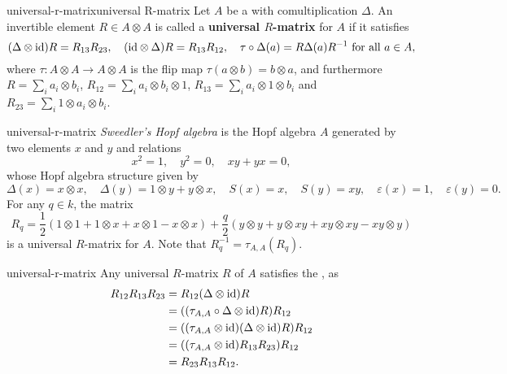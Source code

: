 \begin{topic}{universal-r-matrix}{universal R-matrix}
    Let $A$ be a  with comultiplication $\Delta$. An invertible element $R \in A \otimes A$ is called a \textbf{universal $R$-matrix} for $A$ if it satisfies
    \[ (\Delta \otimes \textup{id}) R = R_{13} R_{23}, \quad (\textup{id} \otimes \Delta) R = R_{13} R_{12}, \quad \tau \circ \Delta (a) = R \Delta(a) R^{-1} \textup{ for all } a \in A , \]
    where $\tau : A \otimes A \to A \otimes A$ is the flip map $\tau(a \otimes b) = b \otimes a$, and furthermore $R = \sum_i a_i \otimes b_i$, $R_{12} = \sum_i a_i \otimes b_i \otimes 1$, $R_{13} = \sum_i a_i \otimes 1 \otimes b_i$ and $R_{23} = \sum_i 1 \otimes a_i \otimes b_i$.
\end{topic}

\begin{example}{universal-r-matrix}
    \textit{Sweedler's Hopf algebra} is the Hopf algebra $A$ generated by two elements $x$ and $y$ and relations
    \[ x^2 = 1, \quad y^2 = 0, \quad xy + yx = 0 , \]
    whose Hopf algebra structure given by
    \[ \Delta(x) = x \otimes x, \quad \Delta(y) = 1 \otimes y + y \otimes x, \quad S(x) = x, \quad S(y) = xy, \quad \varepsilon(x) = 1, \quad \varepsilon(y) = 0 . \]
    For any $q \in k$, the matrix
    \[ R_q = \frac{1}{2} (1 \otimes 1 + 1 \otimes x + x \otimes 1 - x \otimes x) + \frac{q}{2} (y \otimes y + y \otimes xy + xy \otimes xy - xy \otimes y) \]
    is a universal $R$-matrix for $A$. Note that $R_q^{-1} = \tau_{A, A}(R_q)$.
\end{example}

\begin{example}{universal-r-matrix}
    Any universal $R$-matrix $R$ of $A$ satisfies the , as
    \[ \begin{aligned}
        R_{12} R_{13} R_{23}
            &= R_{12} (\Delta \otimes \textup{id}) R \\
            &= ((\tau_{A, A} \circ \Delta \otimes \textup{id}) R) R_{12} \\ 
            &= ((\tau_{A, A} \otimes \textup{id})(\Delta \otimes \textup{id}) R) R_{12} \\
            &= ((\tau_{A, A} \otimes \textup{id}) R_{13} R_{23}) R_{12} \\
            &= R_{23} R_{13} R_{12} . 
    \end{aligned} \]
\end{example}

